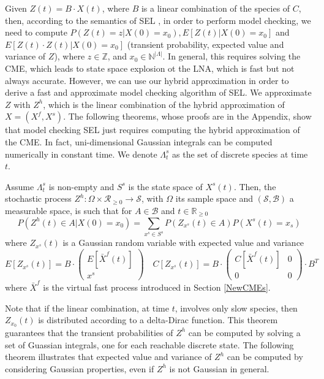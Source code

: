 \documentclass{llncs}
\begin{document}
Given $Z(t)=B\cdot X(t)$, where $B$ is a linear combination of the species of $C$, then, according to the semantics of SEL \cite{cardelli2015stochastic}, in order to perform model checking, we need to compute $P(Z(t)=z|X(0)=x_0), E[Z(t)|X(0)=x_0]$ and $E[Z(t)\cdot Z(t)|X(0)=x_0]$ (transient probability, expected value and variance of $Z$), where $z \in \mathbb{Z}$, and $x_0 \in \mathbb{N}^{|\Lambda|}$.
In general, this requires solving the CME, which leads to state space explosion ot the LNA, which is fast but not always accurate. However, we can use our hybrid approximation in order to derive a fast and approximate model checking algorithm of SEL.
We approximate $Z$ with $Z^h$, which is the linear combination of the hybrid approximation of $X=(X^f,X^s)$.
The following theorems, whose proofs are in the Appendix, show that model checking SEL  just requires computing the hybrid approximation of the CME. In fact, uni-dimensional Gaussian integrals can be computed numerically in constant time. We denote $\Lambda^s_t$ as the set of discrete species at time $t$.
\begin{theorem}\label{Prob-Op}
Assume $\Lambda^s_t$ is non-empty and $S^s$ is the state space of $X^s(t)$.
Then, the stochastic process $Z^h:\Omega \times \mathcal{R}_{\geq 0}\rightarrow \mathcal{S}$, with $\Omega$ its sample space and $(\mathcal{S},\mathcal{B})$ a measurable space, is such that for $A\in \mathcal{B}$ and $t\in \mathbb{R}_{\geq 0}$ 
\begin{equation*}
P(Z^h(t)\in A|X(0)=x_0)=\sum_{x^s \in S^s} P(Z_{x^s}(t)\in A)P(X^s(t)=x_s)
\end{equation*}
where $Z_{x^s}(t)$ is a Gaussian random variable with expected value and variance 
\begin{equation*}
E[Z_{x^s}(t)]=B\cdot
\begin{pmatrix}
E[\bar{X}^f(t)]\\
x^s
\end{pmatrix}
\quad
C[Z_{x^s}(t)]=B\cdot
\begin{pmatrix}
C[\bar{X}^f(t)]&0\\
0&0
\end{pmatrix}
\cdot B^T
\end{equation*}
where $\bar{X}^f$ is the virtual fast process introduced in Section \ref{NewCMEs}.
\end{theorem}
Note that if the linear combination, at time $t$, involves only slow species, then $Z_{x_0}(t)$ is distributed according to a delta-Dirac function.
This theorem guarantees that the transient probabilities of $Z^h$ can be computed by solving a set of Guassian integrals, one for each reachable discrete state. The following theorem illustrates that expected value and variance of $Z^h$ can be computed by considering Gaussian properties, even if $Z^h$ is not Gaussian in general.
\end{document}
